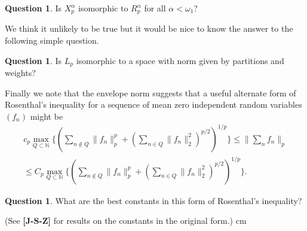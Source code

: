 \documentclass[12pt]{amsart}
\theoremstyle{definition}
\newtheorem{question}[theorem]{Question}
\theoremstyle{remark}
\numberwithin{equation}{section}
\begin{document}
\begin{question}
Is $X_p^\alpha$ isomorphic to $R_p^\alpha$ for all $\alpha<\omega_1$?
\end{question}

We think it unlikely to be true
 but it would be nice to know the answer to the
following simple question.

\begin{question} Is $L_p$ isomorphic to a space with norm given by
partitions and weights?
\end{question}

Finally we note that the envelope norm suggests that a useful alternate form of
Rosenthal's inequality for a sequence of mean zero independent random
variables $(f_n)$ might be
\begin{multline*}c_p \max_{Q\subset \mathbb N}\{ \left(\sum_{n\notin Q}
\|f_n\|^p_p+\left (\sum_{n\in Q}
\|f_n\|^2_2 \right )^{p/2}\right )^{1/p}\} \le \|\sum_n f_n \|_p \\
\le C_p  \max_{Q\subset \mathbb N}\{ \left (\sum_{n\notin Q} 
\|f_n\|^p_p+\left (\sum_{n\in Q}
\|f_n\|^2_2\right)^{p/2}\right )^{1/p}\}
 .\end{multline*}

\begin{question} What are the best constants in this form of Rosenthal's
inequality?
\end{question}

(See {\bf [J-S-Z]} for results on the constants in the original form.)
 cm
\end{document}
